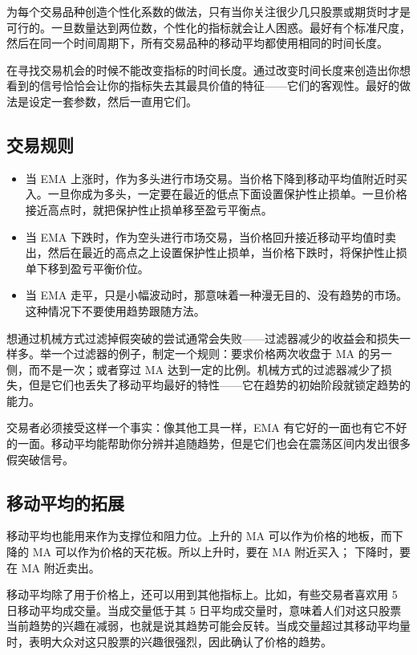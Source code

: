 为每个交易品种创造个性化系数的做法，只有当你关注很少几只股票或期货时才是可行的。一旦数量达到两位数，个性化的指标就会让人困惑。最好有个标准尺度，然后在同一个时间周期下，所有交易品种的移动平均都使用相同的时间长度。

在寻找交易机会的时候不能改变指标的时间长度。通过改变时间长度来创造出你想看到的信号恰恰会让你的指标失去其最具价值的特征——它们的客观性。最好的做法是设定一套参数，然后一直用它们。
\subsection*{交易规则}
\begin{itemize}
    \item 当 EMA 上涨时，作为多头进行市场交易。当价格下降到移动平均值附近时买入。一旦你成为多头，一定要在最近的低点下面设置保护性止损单。一旦价格接近高点时，就把保护性止损单移至盈亏平衡点。
    \item 当 EMA 下跌时，作为空头进行市场交易，当价格回升接近移动平均值时卖出，然后在最近的高点之上设置保护性止损单，当价格下跌时，将保护性止损单下移到盈亏平衡价位。
    \item 当 EMA 走平，只是小幅波动时，那意味着一种漫无目的、没有趋势的市场。这种情况下不要使用趋势跟随方法。
\end{itemize}

\begin{tcolorbox}[title=指数移动平均（EMA）]
    想通过机械方式过滤掉假突破的尝试通常会失败——过滤器减少的收益会和损失一样多。举一个过滤器的例子，制定一个规则：要求价格两次收盘于 MA 的另一侧，而不是一次；或者穿过 MA 达到一定的比例。机械方式的过滤器减少了损失，但是它们也丢失了移动平均最好的特性——它在趋势的初始阶段就锁定趋势的能力。

    交易者必须接受这样一个事实：像其他工具一样，EMA 有它好的一面也有它不好的一面。移动平均能帮助你分辨并追随趋势，但是它们也会在震荡区间内发出很多假突破信号。
\end{tcolorbox}
\subsection*{移动平均的拓展}
移动平均也能用来作为支撑位和阻力位。上升的 MA 可以作为价格的地板，而下降的 MA 可以作为价格的天花板。所以上升时，要在 MA 附近买入；
下降时，要在 MA 附近卖出。

移动平均除了用于价格上，还可以用到其他指标上。比如，有些交易者喜欢用 5 日移动平均成交量。当成交量低于其 5 日平均成交量时，意味着人们对这只股票当前趋势的兴趣在减弱，也就是说其趋势可能会反转。当成交量超过其移动平均量时，表明大众对这只股票的兴趣很强烈，因此确认了价格的趋势。

